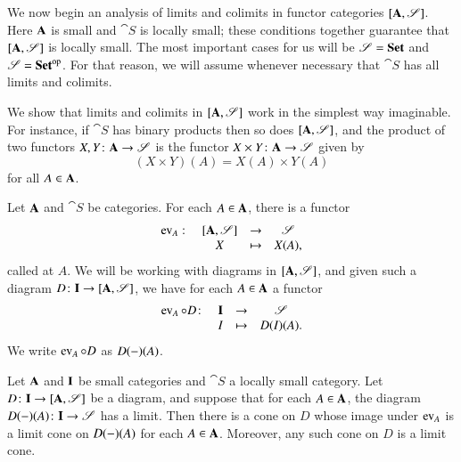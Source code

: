 We now begin an analysis of limits and colimits in functor categories
$[\mathbf{A},\mathscr{S}]$.  Here $\mathbf{A}$ is small and $\cat{S}$ is
locally small; these conditions together guarantee that
$[\mathbf{A},\mathscr{S}]$ is locally small.  The most important cases
for us will be $\mathscr{S} = \mathbf{Set}$ and $\mathscr{S} = \mathbf{Set}^{\mathrm{op}}$.  For that reason,
we will assume whenever necessary that $\cat{S}$ has all limits and
colimits.

We show that limits and colimits in $[\mathbf{A},\mathscr{S}]$ work in
the simplest way imaginable.  For instance, if $\cat{S}$ has binary products
then so does $[\mathbf{A},\mathscr{S}]$, and the product%
%
%
of two functors $X, Y\from \scat{A} \to \cat{S}$ is the functor $X \times
Y\from \scat{A} \to \cat{S}$ given by
\[
(X \times Y)(A) = X(A) \times Y(A)
\]
for all $A \in \mathbf{A}$.

\begin{notn}
Let $\mathbf{A}$ and $\cat{S}$ be categories.  For each $A \in \mathbf{A}$, there
is a functor
\[
\begin{array}{cccc}
\ev_A\from      &\ftrcat{\scat{A}}{\cat{S}}     &
\to             &\cat{S}        \\
                &X                              &
\mapsto         &X(A),
\end{array}%
%
\ntn{ev}
%
\]
called %
%
%
at $A$.  We will be working with diagrams in $[\mathbf{A},\mathscr{S}]$,
and given such a diagram $D\from \scat{I} \to \ftrcat{\scat{A}}{\cat{S}}$,
we have for each $A \in \mathbf{A}$ a functor
\[
\begin{array}{cccc}
\ev_A \of D\from&\scat{I}       &\to            &\cat{S}        \\
                &I              &\mapsto        &D(I)(A).
\end{array}
\]
We write $\operatorname{ev}_A \mathbin{\circ} D$ as $D(-)(A)$.%
%
%
\end{notn}

\begin{thm}
\label{thm:pw}
Let $\mathbf{A}$ and $\mathbf{I}$ be small categories and $\cat{S}$ a locally
small category.  Let $D\from \scat{I} \to \ftrcat{\scat{A}}{\cat{S}}$ be a
diagram, and suppose that for each $A \in \mathbf{A}$, the diagram
$D(\dashbk)(A)\from \scat{I} \to \cat{S}$ has a limit.  Then there is a
cone on $D$ whose image under $\operatorname{ev}_A$ is a limit cone on $D(-)(A)$
for each $A \in \mathbf{A}$.  Moreover, any such cone on $D$ is a limit cone.
\end{thm}

